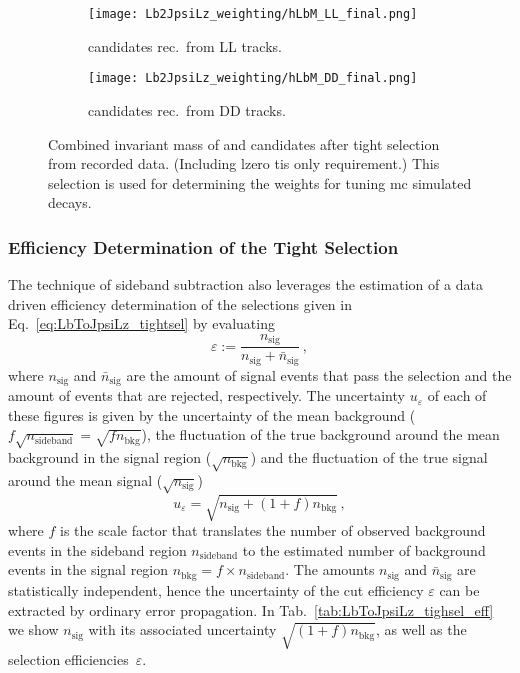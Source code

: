 \begin{figure}[htbp]
    \centering
    \begin{subfigure}[b]{.49\textwidth}
        \centering
        \texttt{[image: Lb2JpsiLz\_weighting/hLbM\_LL\_final.png]}
        \caption{\Lz candidates rec.\ from \gls{LL} tracks.}
    \end{subfigure}
    \begin{subfigure}[b]{.49\textwidth}
        \centering
        \texttt{[image: Lb2JpsiLz\_weighting/hLbM\_DD\_final.png]}
        \caption{\Lz candidates rec.\ from \gls{DD} tracks.}
    \end{subfigure}
    \caption{Combined invariant mass of \jpsi and \Lz candidates after tight selection from recorded data. (Including \gls{lzero} \gls{tis} only requirement.) This selection is used for determining the weights for tuning \gls{mc} simulated \Lb decays.}
    \label{fig:mLbToJpsiLz_tightsel}
\end{figure}

\subsubsection{Efficiency Determination of the Tight Selection}
\label{sec:weights_tightsel}
The technique of sideband subtraction also leverages the estimation of a data driven efficiency determination of the selections given in Eq.~\eqref{eq:LbToJpsiLz_tightsel} by evaluating
\begin{equation*}
    \varepsilon := \frac{n_\text{sig}}{n_\text{sig} + \bar n_\text{sig}} \,,
\end{equation*}
where $n_\text{sig}$ and $\bar n_\text{sig}$ are the amount of signal events that pass the selection and the amount of events that are rejected, respectively.
The uncertainty $u_\varepsilon$ of each of these figures is given by the uncertainty of the mean background ($f \sqrt{n_\text{sideband}} = \sqrt{f n_\text{bkg}}$), the fluctuation of the true background around the mean background in the signal region ($\sqrt{n_\text{bkg}}$) and the fluctuation of the true signal around the mean signal ($\sqrt{n_\text{sig}}$)
\begin{equation*}
    u_\varepsilon = \sqrt{n_\text{sig} + (1 + f) n_\text{bkg}}\,,
\end{equation*}
where $f$ is the scale factor that translates the number of observed background events in the sideband region $n_\text{sideband}$ to the estimated number of background events in the signal region $n_\text{bkg} = f \times n_\text{sideband}$.
The amounts $n_\text{sig}$ and $\bar n_\text{sig}$ are statistically independent, hence the uncertainty of the cut efficiency $\varepsilon$ can be extracted by ordinary error propagation.
In Tab.~\ref{tab:LbToJpsiLz_tighsel_eff} we show $n_\text{sig}$ with its associated uncertainty $\sqrt{(1 + f) n_\text{bkg}}$, as well as the selection efficiencies~$\varepsilon$.

